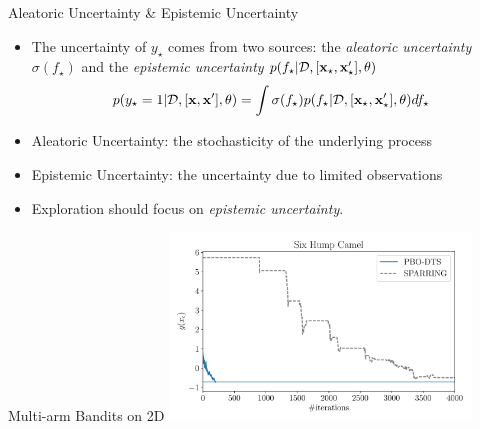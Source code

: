 \documentclass[13pt,aspectratio=1610]{beamer}
\begin{document}
\begin{frame}{Aleatoric Uncertainty \& Epistemic Uncertainty}
\begin{itemize}
\item The uncertainty of $y_\star$ comes from two sources: the \emph{aleatoric uncertainty} $\sigma(f_{\star})$ and the \emph{epistemic uncertainty} $p(f_{\star} | \mathcal{D}, [\mathbf{x}_{\star},\mathbf{x}_{\star}'], \theta)$
$$p(y_{\star} = 1 | \mathcal{D},  [{\bf x},{\bf x}'], \theta) 
= \int \sigma(f_{\star}) p(f_{\star} | \mathcal{D}, [\mathbf{x}_{\star},\mathbf{x}_{\star}'], \theta) df_{\star} $$
\item Aleatoric Uncertainty: the stochasticity of the underlying process 
\item Epistemic Uncertainty: the uncertainty due to limited observations
\item Exploration should focus on \emph{epistemic uncertainty}.
\end{itemize}
\end{frame}


\begin{frame}{Multi-arm Bandits on 2D}
\centering
\includegraphics[width=0.6\textwidth]{results_sixhump_comparison.pdf}
\end{frame}


{\footnotesize

}
%
\end{document}

